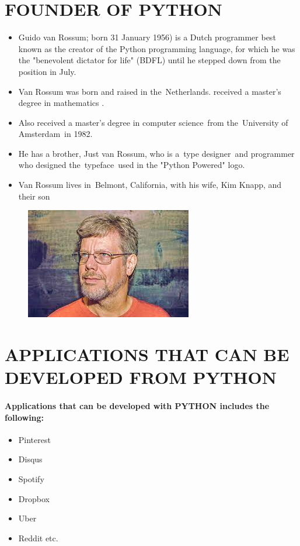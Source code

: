 \documentclass{article}
\begin{document}
\section*{FOUNDER OF PYTHON}
\begin{itemize}
	\item Guido van Rossum; born 31 January 1956) is a Dutch programmer best known as the creator of the Python programming language, for which he was the "benevolent dictator for life" (BDFL) until he stepped down from the position in July.
	\item Van Rossum was born and raised in the Netherlands.
	received a master's degree in mathematics . 
	\item Also received a master’s degree in computer science from the University of Amsterdam in 1982.
	\item He has a brother, Just van Rossum, who is a type designer and programmer who designed the typeface used in the "Python Powered" logo.
	\item Van Rossum lives in Belmont, California, with his wife, Kim Knapp, and their son
	
\end{itemize}
\begin{figure}
		\begin{center}
	\includegraphics[width=0.4\linewidth]{guido.jpg}
\end{center}
\end{figure}
\newpage
\section*{APPLICATIONS THAT CAN BE DEVELOPED FROM PYTHON}
\paragraph{Applications that can be developed with PYTHON includes the following:
}
\begin{itemize}
	\item Pinterest
	\item Disqus
	\item Spotify
	\item Dropbox
	\item Uber
	\item Reddit etc.
\end{itemize}
\newpage
\end{document}
